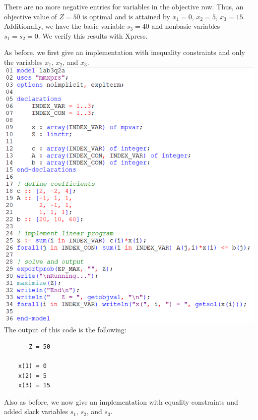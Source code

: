 \documentclass[12pt]{article}
\theoremstyle{definition}
\begin{document}
There are no more negative entries for variables in the objective row. Thus, an objective value of $Z = 50$ is optimal and is attained by $x_1 = 0$, $x_2 = 5$, $x_3 = 15$. Additionally, we have the basic variable $s_3 = 40$ and nonbasic variables $s_1 = s_2 = 0$. We verify this results with Xpress.

\newpage

As before, we first give an implementation with inequality constraints and only the variables $x_1$, $x_2$, and $x_3$.\\

\includegraphics[scale=0.7]{code2a.png}\\
The output of this code is the following:

\lstset{basicstyle=\ttfamily}
\begin{lstlisting}
       Z = 50
    
    x(1) = 0
    x(2) = 5
    x(3) = 15
\end{lstlisting}

\newpage

Also as before, we now give an implementation with equality constraints and added slack variables $s_1$, $s_2$, and $s_3$.\\
\end{document}
